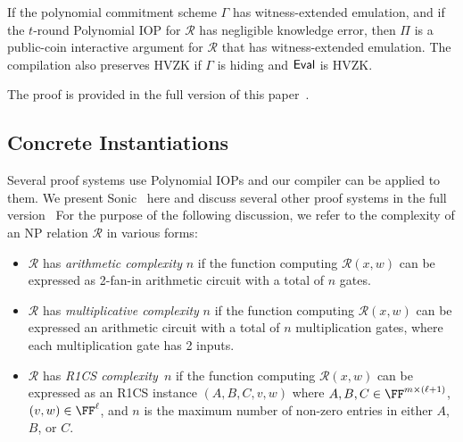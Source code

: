 \begin{theorem}\label{thm:IOPcompiler}
If the polynomial commitment scheme $\Gamma$ has witness-extended emulation, and if the $t$-round Polynomial IOP for $\mathcal{R}$ has negligible knowledge error, then $\Pi$ is a public-coin interactive argument for $\mathcal{R}$ that has witness-extended emulation. The compilation also preserves HVZK if $\Gamma$ is hiding and $\textsf{{Eval}}$ is HVZK. 
\end{theorem}

The proof is provided in the full version of this paper~\cite[\S B]{DARK/Supersonic:fullversion}. 

\subsection{Concrete Instantiations} 

Several proof systems use Polynomial IOPs and our compiler can be applied to them. We present \textsf{Sonic}~\cite{Sonic} here and discuss several other proof systems \cite{Plonk,Marlin,C:BBHR19,Spartan,EC:GGPR13} in the full version~\cite{DARK/Supersonic:fullversion}
For the purpose of the following discussion, we refer to the complexity of an NP relation $\mathcal{R}$ in various forms: 
\begin{itemize}
\item $\mathcal{R}$ has \emph{arithmetic complexity} $n$ if the function computing $\mathcal{R}(x, w)$ can be expressed as 2-fan-in arithmetic circuit with a total of $n$ gates. 
\item $\mathcal{R}$ has \emph{multiplicative complexity} $n$ if the function computing $\mathcal{R}(x, w)$ can be expressed an arithmetic circuit with a total of $n$ multiplication gates, where each multiplication gate has 2 inputs.
\item $\mathcal{R}$ has \emph{R1CS complexity}\footnotemark \ $n$ if the function computing $\mathcal{R}(x, w)$ can be expressed as an R1CS instance $(A, B, C, v, w)$ where $A, B, C \in \FF^{m \times (\ell+1)}$, $(v,w) \in \FF^\ell$, and $n$ is the maximum number of non-zero entries in either $A$, $B$, or $C$. 
\end{itemize}
\fi

